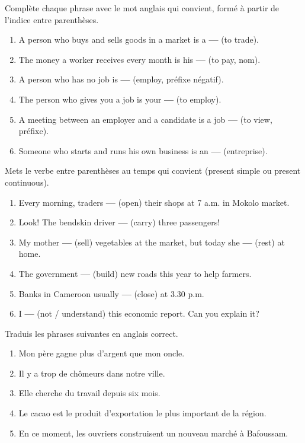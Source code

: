 \documentclass[11pt]{article}
\newcounter{popsec}
\newcounter{popsub}
\newcommand{\courssub}[1]{%
  \stepcounter{popsub}%
  \par\vspace{9pt}\noindent{\popxbold\fontsize{11.5}{13}\selectfont\color{popink}{\color{poporange}\thepopsec.\thepopsub}\hspace{6pt}#1}\par\nopagebreak\vspace{4pt}
}
\begin{document}
\begin{exercice}
Complète chaque phrase avec le mot anglais qui convient, formé à partir de l'indice entre parenthèses.
\begin{enumerate}
\item A person who buys and sells goods in a market is a \textbf{---} (to trade).
\item The money a worker receives every month is his \textbf{---} (to pay, nom).
\item A person who has no job is \textbf{---} (employ, préfixe négatif).
\item The person who gives you a job is your \textbf{---} (to employ).
\item A meeting between an employer and a candidate is a job \textbf{---} (to view, préfixe).
\item Someone who starts and runs his own business is an \textbf{---} (entreprise).
\end{enumerate}
\end{exercice}

\begin{exercice}
Mets le verbe entre parenthèses au temps qui convient (present simple ou present continuous).
\begin{enumerate}
\item Every morning, traders \textbf{---} (open) their shops at 7 a.m. in Mokolo market.
\item Look! The bendskin driver \textbf{---} (carry) three passengers!
\item My mother \textbf{---} (sell) vegetables at the market, but today she \textbf{---} (rest) at home.
\item The government \textbf{---} (build) new roads this year to help farmers.
\item Banks in Cameroon usually \textbf{---} (close) at 3.30 p.m.
\item I \textbf{---} (not / understand) this economic report. Can you explain it?
\end{enumerate}
\end{exercice}

\courssub{Je m'entraîne}

\begin{exercice}[Traduction]
Traduis les phrases suivantes en anglais correct.
\begin{enumerate}
\item Mon père gagne plus d'argent que mon oncle.
\item Il y a trop de chômeurs dans notre ville.
\item Elle cherche du travail depuis six mois.
\item Le cacao est le produit d'exportation le plus important de la région.
\item En ce moment, les ouvriers construisent un nouveau marché à Bafoussam.
\end{enumerate}
\end{exercice}
\end{document}
